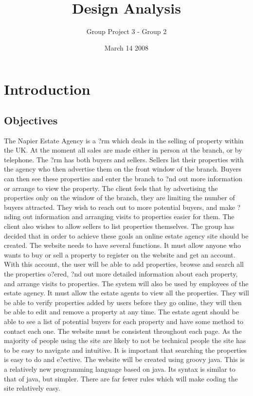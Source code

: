 \documentclass[a4paper,12pt]{article}
\title{Design Analysis}
\author{Group Project 3 - Group 2}
\date{March 14 2008}
\begin{document}
\maketitle
\newpage
\tableofcontents
\newpage




 
\section{Introduction}
\subsection{Objectives}
The Napier Estate Agency is a ?rm which deals in the selling of property within the UK. At the moment all sales are made either in person at the branch, or by telephone. The ?rm has both buyers and sellers. Sellers list their properties with the agency who then advertise them on the front window of the branch. Buyers can then see these properties and enter the branch to ?nd out more information or arrange to view the property.
The client feels that by advertising the properties only on the window of the branch, they are limiting the number of buyers attracted. They wish to reach out to more potential buyers, and make ?nding out information and arranging visits to properties easier for them. The client also wishes to allow sellers to list properties themselves. The group has decided that in order to achieve these goals an online estate agency site should be created.
The website needs to have several functions. It must allow anyone who wants to buy or sell a property to register on the website and get an account.
With this account, the user will be able to add properties, browse and search all the properties o?ered, ?nd out more detailed information about each property, and arrange visits to properties.
The system will also be used by employees of the estate agency. It must allow the estate agents to view all the properties. They will be able to verify properties added by users before they go online, they will then be able to edit and remove a property at any time. The estate agent should be able to see a list of potential buyers for each property and have some method to contact each one.
The website must be consistent throughout each page. As the majority of people using the site are likely to not be technical people the site has to be easy to navigate and intuitive. It is important that searching the properties is easy to do and e?ective.
The website will be created using groovy java. This is a relatively new programming language based on java. Its syntax is similar to that of java, but simpler. There are far fewer rules which will make coding the site relatively easy.
\end{document}
